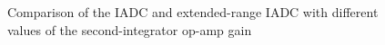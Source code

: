 \begin{figure}[h]
\centering
{}
\qquad
{}
\caption{Comparison of the IADC and extended-range IADC with different values of the second-integrator op-amp gain}
\label{SNR_G2}
\end{figure}


 
